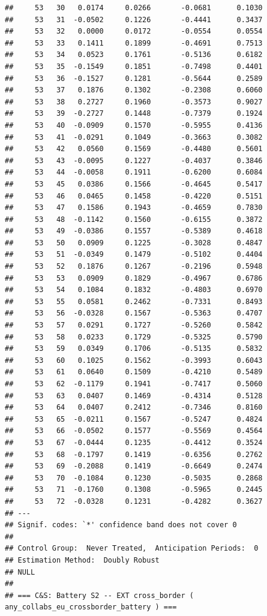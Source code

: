 \documentclass[
]{article}
\begin{document}
\begin{verbatim}
##     53   30   0.0174     0.0266       -0.0681      0.1030  
##     53   31  -0.0502     0.1226       -0.4441      0.3437  
##     53   32   0.0000     0.0172       -0.0554      0.0554  
##     53   33   0.1411     0.1899       -0.4691      0.7513  
##     53   34   0.0523     0.1761       -0.5136      0.6182  
##     53   35  -0.1549     0.1851       -0.7498      0.4401  
##     53   36  -0.1527     0.1281       -0.5644      0.2589  
##     53   37   0.1876     0.1302       -0.2308      0.6060  
##     53   38   0.2727     0.1960       -0.3573      0.9027  
##     53   39  -0.2727     0.1448       -0.7379      0.1924  
##     53   40  -0.0909     0.1570       -0.5955      0.4136  
##     53   41  -0.0291     0.1049       -0.3663      0.3082  
##     53   42   0.0560     0.1569       -0.4480      0.5601  
##     53   43  -0.0095     0.1227       -0.4037      0.3846  
##     53   44  -0.0058     0.1911       -0.6200      0.6084  
##     53   45   0.0386     0.1566       -0.4645      0.5417  
##     53   46   0.0465     0.1458       -0.4220      0.5151  
##     53   47   0.1586     0.1943       -0.4659      0.7830  
##     53   48  -0.1142     0.1560       -0.6155      0.3872  
##     53   49  -0.0386     0.1557       -0.5389      0.4618  
##     53   50   0.0909     0.1225       -0.3028      0.4847  
##     53   51  -0.0349     0.1479       -0.5102      0.4404  
##     53   52   0.1876     0.1267       -0.2196      0.5948  
##     53   53   0.0909     0.1829       -0.4967      0.6786  
##     53   54   0.1084     0.1832       -0.4803      0.6970  
##     53   55   0.0581     0.2462       -0.7331      0.8493  
##     53   56  -0.0328     0.1567       -0.5363      0.4707  
##     53   57   0.0291     0.1727       -0.5260      0.5842  
##     53   58   0.0233     0.1729       -0.5325      0.5790  
##     53   59   0.0349     0.1706       -0.5135      0.5832  
##     53   60   0.1025     0.1562       -0.3993      0.6043  
##     53   61   0.0640     0.1509       -0.4210      0.5489  
##     53   62  -0.1179     0.1941       -0.7417      0.5060  
##     53   63   0.0407     0.1469       -0.4314      0.5128  
##     53   64   0.0407     0.2412       -0.7346      0.8160  
##     53   65  -0.0211     0.1567       -0.5247      0.4824  
##     53   66  -0.0502     0.1577       -0.5569      0.4564  
##     53   67  -0.0444     0.1235       -0.4412      0.3524  
##     53   68  -0.1797     0.1419       -0.6356      0.2762  
##     53   69  -0.2088     0.1419       -0.6649      0.2474  
##     53   70  -0.1084     0.1230       -0.5035      0.2868  
##     53   71  -0.1760     0.1308       -0.5965      0.2445  
##     53   72  -0.0328     0.1231       -0.4282      0.3627  
## ---
## Signif. codes: `*' confidence band does not cover 0
## 
## Control Group:  Never Treated,  Anticipation Periods:  0
## Estimation Method:  Doubly Robust
## NULL
## 
## === C&S: Battery S2 -- EXT cross_border ( any_collabs_eu_crossborder_battery ) ===
\end{verbatim}
\end{document}
